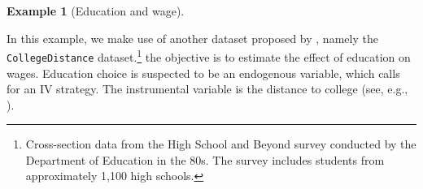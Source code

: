 \documentclass[
  12pt,
]{book}
\newenvironment{Shaded}{\begin{snugshade}}{\end{snugshade}}
\newcommand{\AttributeTok}[1]{\textcolor[rgb]{0.77,0.63,0.00}{#1}}
\newcommand{\FloatTok}[1]{\textcolor[rgb]{0.00,0.00,0.81}{#1}}
\newcommand{\FunctionTok}[1]{\textcolor[rgb]{0.00,0.00,0.00}{#1}}
\newcommand{\NormalTok}[1]{#1}
\newcommand{\OtherTok}[1]{\textcolor[rgb]{0.56,0.35,0.01}{#1}}
\newcommand{\SpecialCharTok}[1]{\textcolor[rgb]{0.00,0.00,0.00}{#1}}
\newcommand{\StringTok}[1]{\textcolor[rgb]{0.31,0.60,0.02}{#1}}
\theoremstyle{definition}
\theoremstyle{definition}
\newtheorem{example}{Example}[chapter]
\theoremstyle{definition}
\theoremstyle{definition}
\theoremstyle{remark}
\begin{document}
\begin{example}[Education and wage]
\protect\hypertarget{exm:IVCollegeDistance}{}\label{exm:IVCollegeDistance}

In this example, we make use of another dataset proposed by \citet{Stock_Watson_2003}, namely the \texttt{CollegeDistance} dataset.\footnote{Cross-section data from the High School and Beyond survey conducted by the Department of Education in the 80s. The survey includes students from approximately 1,100 high schools.} the objective is to estimate the effect of education on wages. Education choice is suspected to be an endogenous variable, which calls for an IV strategy. The instrumental variable is the distance to college (see, e.g., \citet{DEE20041697}).

\begin{Shaded}
\end{Shaded}
\end{example}
\end{document}
